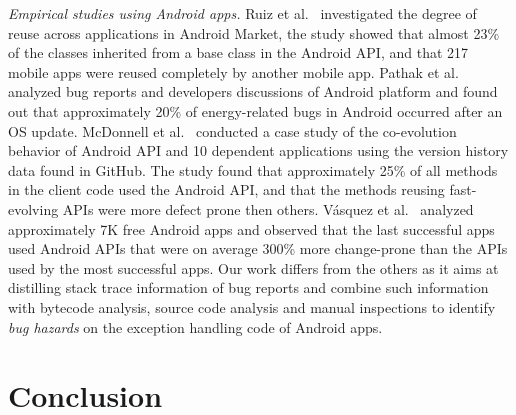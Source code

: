 \documentclass[conference]{IEEEtran}
\begin{document}
\textit{Empirical studies using Android apps.} Ruiz et al.~\cite{Ruiz12}
investigated the degree of reuse across applications in Android Market, the
study showed that almost 23\% of the classes inherited from a base class in the
Android API, and that 217 mobile apps were reused completely by another mobile
app. Pathak et al.~\cite{Patha11} analyzed bug reports and developers
discussions of Android platform and found out that approximately 20\% of
energy-related bugs in Android occurred after an OS update. McDonnell et
al.~\cite{McDon13} conducted a case study of the co-evolution behavior of
Android API and 10 dependent applications using the version history data found
in GitHub. The study found that approximately 25\% of all methods in the client
code used the Android API, and that the methods reusing fast-evolving APIs were
more defect prone then others. Vásquez et al.~\cite{Linar13} analyzed
approximately 7K free Android apps and observed that the last successful apps
used Android APIs that were on average 300\% more change-prone than the APIs
used by the most successful apps. Our work differs from the others as it aims at
distilling stack trace information of bug reports and combine such information
with bytecode analysis, source code analysis and manual inspections
to identify \emph{bug hazards} on the exception handling code of Android apps.


\enlargethispage{-2\baselineskip}

\section{Conclusion}
\label{sec:conc}
\end{document}
